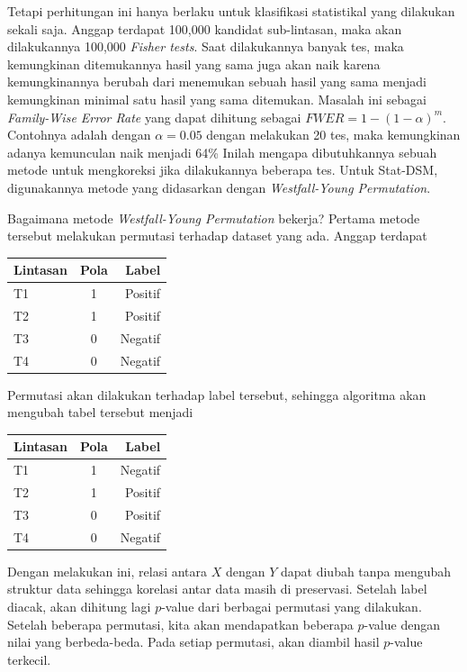 \documentclass[a4paper,twoside]{article}
\begin{document}
Tetapi perhitungan ini hanya berlaku untuk klasifikasi statistikal yang dilakukan sekali saja.
Anggap terdapat 100,000 kandidat sub-lintasan, maka akan dilakukannya 100,000 \textit{Fisher tests}.
Saat dilakukannya banyak tes, maka kemungkinan ditemukannya hasil yang sama juga akan naik karena kemungkinannya berubah dari menemukan sebuah hasil yang sama menjadi kemungkinan minimal satu hasil yang sama ditemukan.
Masalah ini sebagai \textit{Family-Wise Error Rate} yang dapat dihitung sebagai $FWER = 1-(1-\alpha)^m$.
Contohnya adalah dengan $\alpha = 0.05$ dengan melakukan 20 tes, maka kemungkinan adanya kemunculan naik menjadi 64\%
Inilah mengapa dibutuhkannya sebuah metode untuk mengkoreksi jika dilakukannya beberapa tes.
Untuk Stat-DSM, digunakannya metode yang didasarkan dengan \textit{Westfall-Young Permutation}.

Bagaimana metode \textit{Westfall-Young Permutation} bekerja?
Pertama metode tersebut melakukan permutasi terhadap dataset yang ada.
Anggap terdapat 
\begin{table}[ht]
	\centering
	\begin{tabular}{l|c|r}
		\toprule
		\textbf{Lintasan} & \textbf{Pola} & \textbf{Label} \\
		\midrule
		T1 & 1 & Positif \\
		T2 & 1 & Positif \\
		T3 & 0 & Negatif \\
		T4 & 0 & Negatif \\
		\bottomrule
	\end{tabular}
\end{table}

Permutasi akan dilakukan terhadap label tersebut, sehingga algoritma akan mengubah tabel tersebut menjadi
\begin{table}[ht]
	\centering
	\begin{tabular}{l|c|r}
		\toprule
		\textbf{Lintasan} & \textbf{Pola} & \textbf{Label} \\
		\midrule
		T1 & 1 & Negatif \\
		T2 & 1 & Positif \\
		T3 & 0 & Positif \\
		T4 & 0 & Negatif \\
		\bottomrule
	\end{tabular}
\end{table}

Dengan melakukan ini, relasi antara $X$ dengan $Y$ dapat diubah tanpa mengubah struktur data sehingga korelasi antar data masih di preservasi.
Setelah label diacak, akan dihitung lagi $p$-value dari berbagai permutasi yang dilakukan.
Setelah beberapa permutasi, kita akan mendapatkan beberapa $p$-value dengan nilai yang berbeda-beda. 
Pada setiap permutasi, akan diambil hasil $p$-value terkecil.
\end{document}
